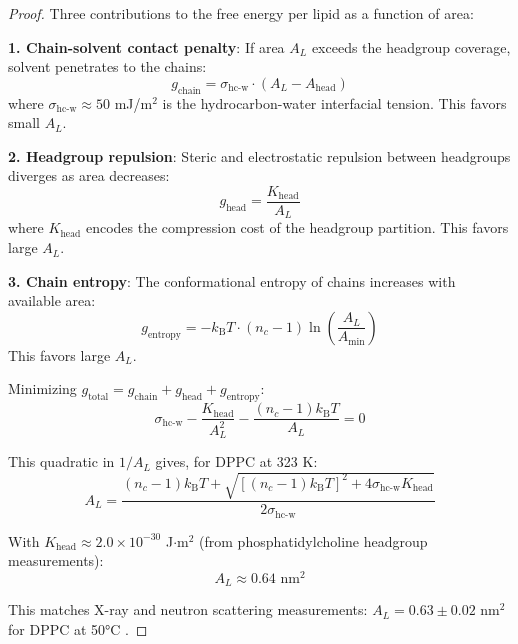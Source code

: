\documentclass[twocolumn,10pt]{article}
\theoremstyle{remark}
\newcommand{\kB}{k_{\mathrm{B}}}
\begin{document}
\begin{proof}
Three contributions to the free energy per lipid as a function of area:

\textbf{1. Chain-solvent contact penalty}: If area $A_L$ exceeds the headgroup coverage, solvent penetrates to the chains:
\begin{equation}
    g_{\text{chain}} = \sigma_{\text{hc-w}} \cdot (A_L - A_{\text{head}})
\end{equation}
where $\sigma_{\text{hc-w}} \approx 50$ mJ/m$^2$ is the hydrocarbon-water interfacial tension. This favors small $A_L$.

\textbf{2. Headgroup repulsion}: Steric and electrostatic repulsion between headgroups diverges as area decreases:
\begin{equation}
    g_{\text{head}} = \frac{K_{\text{head}}}{A_L}
\end{equation}
where $K_{\text{head}}$ encodes the compression cost of the headgroup partition. This favors large $A_L$.

\textbf{3. Chain entropy}: The conformational entropy of chains increases with available area:
\begin{equation}
    g_{\text{entropy}} = -\kB T \cdot (n_c - 1) \ln\left(\frac{A_L}{A_{\min}}\right)
\end{equation}
This favors large $A_L$.

Minimizing $g_{\text{total}} = g_{\text{chain}} + g_{\text{head}} + g_{\text{entropy}}$:
\begin{equation}
    \sigma_{\text{hc-w}} - \frac{K_{\text{head}}}{A_L^2} - \frac{(n_c - 1)\kB T}{A_L} = 0
\end{equation}

This quadratic in $1/A_L$ gives, for DPPC at 323 K:
\begin{equation}
    A_L = \frac{(n_c-1)\kB T + \sqrt{[(n_c-1)\kB T]^2 + 4\sigma_{\text{hc-w}} K_{\text{head}}}}{2\sigma_{\text{hc-w}}}
\end{equation}

With $K_{\text{head}} \approx 2.0 \times 10^{-30}$ J$\cdot$m$^2$ (from phosphatidylcholine headgroup measurements):
\begin{equation}
    A_L \approx 0.64 \text{ nm}^2
\end{equation}

This matches X-ray and neutron scattering measurements: $A_L = 0.63 \pm 0.02$ nm$^2$ for DPPC at 50°C \cite{nagle2000,kucerka2011}.
\end{proof}
\end{document}

